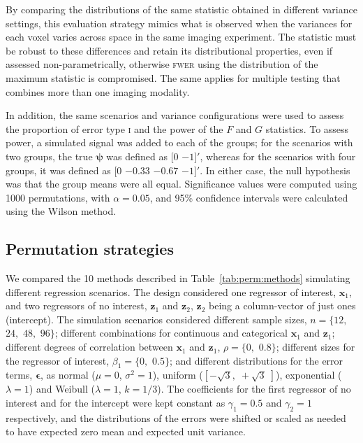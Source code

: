 By comparing the distributions of the same statistic obtained in different variance settings, this evaluation strategy mimics what is observed when the variances for each voxel varies across space in the same imaging experiment. The statistic must be robust to these differences and retain its distributional properties, even if assessed non-parametrically, otherwise \textsc{fwer} using the distribution of the maximum statistic is compromised. The same applies for multiple testing that combines more than one imaging modality.

In addition, the same scenarios and variance configurations were used to assess the proportion of error type \textsc{i} and the power of the $F$ and $G$ statistics. To assess power, a simulated signal was added to each of the groups; for the scenarios with two groups, the true $\boldsymbol{\psi}$ was defined as $[0$ $-1]'$, whereas for the scenarios with four groups, it was defined as $[0$  $-0.33$ $-0.67$ $-1]'$. In either case, the null hypothesis was that the group means were all equal. Significance values were computed using 1000 permutations, with $\alpha=0.05$, and 95\% confidence intervals were calculated using the Wilson method.

\subsection{Permutation strategies}
\label{sec:perm:method_perm}

We compared the 10 methods described in Table~\ref{tab:perm:methods} simulating different regression scenarios. The design considered one regressor of interest, $\mathbf{x}_{1}$, and two regressors of no interest, $\mathbf{z}_{1}$ and $\mathbf{z}_{2}$, $\mathbf{z}_{2}$ being a column-vector of just ones (intercept). The simulation scenarios considered different sample sizes, $n=\{12,$ $24,$ $48,$ $96\}$; different combinations for continuous and categorical $\mathbf{x}_{1}$ and $\mathbf{z}_{1}$; different degrees of correlation between $\mathbf{x}_{1}$ and $\mathbf{z}_{1}$, $\rho = \{0,$ $0.8\}$; different sizes for the regressor of interest, $\beta_{1}=\{0,$ $0.5\}$; and different distributions for the error terms, $\boldsymbol{\epsilon}$, as normal ($\mu=0$, $\sigma^2=1$), uniform ($\left[-\sqrt{3},\; +\sqrt{3}\;\right]$), exponential ($\lambda=1$) and Weibull ($\lambda=1$, $k=1/3$). The coefficients for the first regressor of no interest and for the intercept were kept constant as $\gamma_{1}=0.5$ and $\gamma_{2}=1$ respectively, and the distributions of the errors were shifted or scaled as needed to have expected zero mean and expected unit variance.

